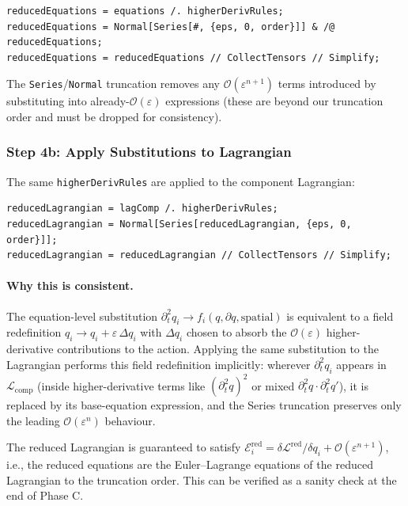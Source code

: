 \begin{verbatim}
reducedEquations = equations /. higherDerivRules;
reducedEquations = Normal[Series[#, {eps, 0, order}]] & /@ reducedEquations;
reducedEquations = reducedEquations // CollectTensors // Simplify;
\end{verbatim}

The \texttt{Series}/\texttt{Normal} truncation removes any $\mathcal{O}(\varepsilon^{n+1})$ terms introduced by substituting into already-$\mathcal{O}(\varepsilon)$ expressions (these are beyond our truncation order and must be dropped for consistency).

\subsubsection{Step 4b: Apply Substitutions to Lagrangian}

The same \texttt{higherDerivRules} are applied to the component Lagrangian:

\begin{verbatim}
reducedLagrangian = lagComp /. higherDerivRules;
reducedLagrangian = Normal[Series[reducedLagrangian, {eps, 0, order}]];
reducedLagrangian = reducedLagrangian // CollectTensors // Simplify;
\end{verbatim}

\paragraph{Why this is consistent.} The equation-level substitution $\partial_t^2 q_i \to f_i(q, \partial q, \text{spatial})$ is equivalent to a field redefinition $q_i \to q_i + \varepsilon\, \Delta q_i$ with $\Delta q_i$ chosen to absorb the $\mathcal{O}(\varepsilon)$ higher-derivative contributions to the action. Applying the same substitution to the Lagrangian performs this field redefinition implicitly: wherever $\partial_t^2 q_i$ appears in $\mathcal{L}_{\mathrm{comp}}$ (inside higher-derivative terms like $(\partial_t^2 q)^2$ or mixed $\partial_t^2 q \cdot \partial_t^2 q'$), it is replaced by its base-equation expression, and the Series truncation preserves only the leading $\mathcal{O}(\varepsilon^n)$ behaviour.

The reduced Lagrangian is guaranteed to satisfy $\mathcal{E}_i^{\mathrm{red}} = \delta \mathcal{L}^{\mathrm{red}}/\delta q_i + \mathcal{O}(\varepsilon^{n+1})$, i.e., the reduced equations are the Euler--Lagrange equations of the reduced Lagrangian to the truncation order. This can be verified as a sanity check at the end of Phase C.

